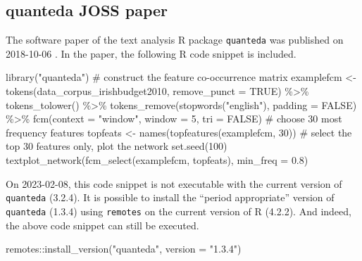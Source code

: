 \documentclass[
  10pt,
  letterpaper,
]{article}
\newenvironment{Shaded}{\begin{snugshade}}{\end{snugshade}}
\newcommand{\AttributeTok}[1]{\textcolor[rgb]{0.40,0.45,0.13}{#1}}
\newcommand{\CommentTok}[1]{\textcolor[rgb]{0.37,0.37,0.37}{#1}}
\newcommand{\ConstantTok}[1]{\textcolor[rgb]{0.56,0.35,0.01}{#1}}
\newcommand{\DecValTok}[1]{\textcolor[rgb]{0.68,0.00,0.00}{#1}}
\newcommand{\FloatTok}[1]{\textcolor[rgb]{0.68,0.00,0.00}{#1}}
\newcommand{\FunctionTok}[1]{\textcolor[rgb]{0.28,0.35,0.67}{#1}}
\newcommand{\NormalTok}[1]{\textcolor[rgb]{0.00,0.23,0.31}{#1}}
\newcommand{\OtherTok}[1]{\textcolor[rgb]{0.00,0.23,0.31}{#1}}
\newcommand{\SpecialCharTok}[1]{\textcolor[rgb]{0.37,0.37,0.37}{#1}}
\newcommand{\StringTok}[1]{\textcolor[rgb]{0.13,0.47,0.30}{#1}}
\begin{document}
\hypertarget{quanteda-joss-paper}{%
\subsection{quanteda JOSS paper}\label{quanteda-joss-paper}}

The software paper of the text analysis R package \texttt{quanteda} was
published on 2018-10-06 \citep{benoit:2018}. In the paper, the following
R code snippet is included.

\begin{Shaded}
\begin{Highlighting}[]
\FunctionTok{library}\NormalTok{(}\StringTok{"quanteda"}\NormalTok{)}
\CommentTok{\# construct the feature co{-}occurrence matrix}
\NormalTok{examplefcm }\OtherTok{\textless{}{-}}
\FunctionTok{tokens}\NormalTok{(data\_corpus\_irishbudget2010, }\AttributeTok{remove\_punct =} \ConstantTok{TRUE}\NormalTok{) }\SpecialCharTok{\%\textgreater{}\%}
\FunctionTok{tokens\_tolower}\NormalTok{() }\SpecialCharTok{\%\textgreater{}\%}
\FunctionTok{tokens\_remove}\NormalTok{(}\FunctionTok{stopwords}\NormalTok{(}\StringTok{"english"}\NormalTok{), }\AttributeTok{padding =} \ConstantTok{FALSE}\NormalTok{) }\SpecialCharTok{\%\textgreater{}\%}
\FunctionTok{fcm}\NormalTok{(}\AttributeTok{context =} \StringTok{"window"}\NormalTok{, }\AttributeTok{window =} \DecValTok{5}\NormalTok{, }\AttributeTok{tri =} \ConstantTok{FALSE}\NormalTok{)}
\CommentTok{\# choose 30 most frequency features}
\NormalTok{topfeats }\OtherTok{\textless{}{-}} \FunctionTok{names}\NormalTok{(}\FunctionTok{topfeatures}\NormalTok{(examplefcm, }\DecValTok{30}\NormalTok{))}
\CommentTok{\# select the top 30 features only, plot the network}
\FunctionTok{set.seed}\NormalTok{(}\DecValTok{100}\NormalTok{)}
\FunctionTok{textplot\_network}\NormalTok{(}\FunctionTok{fcm\_select}\NormalTok{(examplefcm, topfeats), }\AttributeTok{min\_freq =} \FloatTok{0.8}\NormalTok{)}
\end{Highlighting}
\end{Shaded}

On 2023-02-08, this code snippet is not executable with the current
version of \texttt{quanteda} (3.2.4). It is possible to install the
``period appropriate'' version of \texttt{quanteda} (1.3.4) using
\texttt{remotes} on the current version of R (4.2.2). And indeed, the
above code snippet can still be executed.

\begin{Shaded}
\begin{Highlighting}[]
\NormalTok{remotes}\SpecialCharTok{::}\FunctionTok{install\_version}\NormalTok{(}\StringTok{"quanteda"}\NormalTok{, }\AttributeTok{version =} \StringTok{"1.3.4"}\NormalTok{)}
\end{Highlighting}
\end{Shaded}
\end{document}
